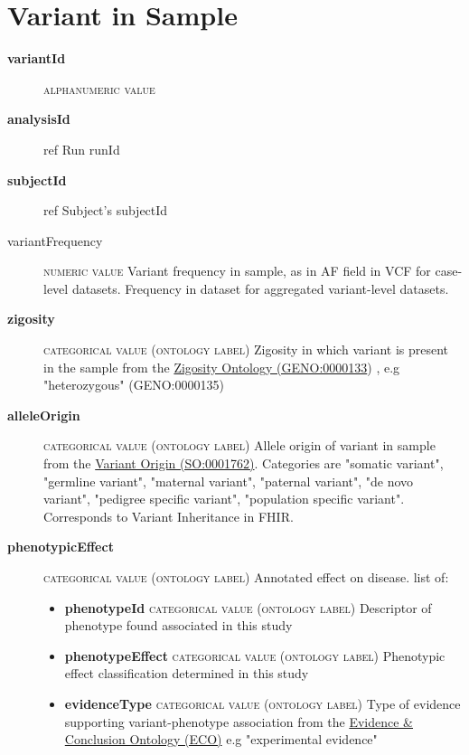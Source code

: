 \documentclass[a4paper, 10pt]{article}        %
\begin{document}
 
 
   \section*{ {\color{teal} Variant in Sample}}
  
  \begin{description}
  	\item[\textbf{variantId}]  {\textsc{alphanumeric value}} 
	\item[\textbf{analysisId}] ref Run runId
	\item[\textbf{subjectId}] ref Subject's subjectId
	\item[variantFrequency] {\textsc{numeric value}} Variant frequency in sample, as in AF field in VCF for case-level datasets. Frequency in dataset for aggregated variant-level datasets.
	\item[\textbf{zigosity}] {\textsc{categorical value (ontology label)}} Zigosity in which variant is present in the sample from the \href{link}{Zigosity Ontology (GENO:0000133}) , e.g "heterozygous" (GENO:0000135)
	\item[\textbf{alleleOrigin}] {\textsc{categorical value (ontology label)}} Allele origin of variant in sample from the \href{link}{Variant Origin (SO:0001762)}. Categories are "somatic variant", "germline variant", "maternal variant", "paternal variant",  "de novo variant", "pedigree specific variant", "population specific variant". Corresponds to Variant Inheritance in FHIR.
	\item[\textbf{phenotypicEffect}]  {\textsc{categorical value (ontology label)}} Annotated effect on disease. list of:
	\begin{itemize}
				\item[] \textbf{phenotypeId} {\textsc{categorical value (ontology label)}} Descriptor of phenotype found associated in this study
				\item[] \textbf{phenotypeEffect} {\textsc{categorical value (ontology label)}} Phenotypic effect classification determined in this study
				\item[] \textbf{evidenceType} {\textsc{categorical value (ontology label)}} Type of evidence supporting variant-phenotype association from the \href{http://purl.obolibrary.org/obo/eco.owl}{Evidence \& Conclusion Ontology (ECO)} e.g "experimental evidence"

\end{itemize}
\end{description}
\end{document}
